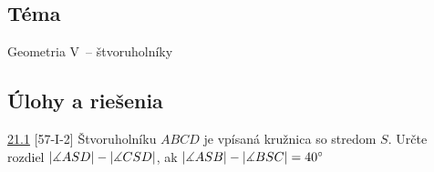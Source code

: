 
\subsection*{Téma}
Geometria V~-- štvoruholníky

\subsection*{Úlohy a riešenia}
\begin{tcolorbox}[breakable,notitle,boxrule=0pt,colback=light-gray,colframe=light-gray]\ul{21.1} [57-I-2] Štvoruholníku $ABCD$ je vpísaná kružnica so stredom $S$. Určte rozdiel $|\measuredangle ASD|- |\measuredangle CSD|$, ak $|\measuredangle ASB| - |\measuredangle BSC| = 40^\circ$

\end{tcolorbox}


